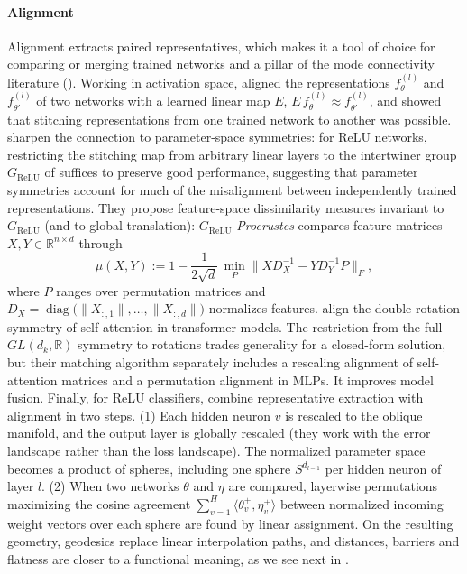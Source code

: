 \documentclass[mathematics,review,submit,moreauthors]{Definitions/mdpi}
\begin{document}
\paragraph{Alignment}
Alignment extracts paired representatives, which makes it a tool of choice for comparing or merging trained networks and a pillar of the mode connectivity literature ().
Working in activation space, \citet{lenc2014a} aligned the representations $f_\theta^{(l)}$ and $f_{\theta'}^{(l)}$ of two networks with a learned linear map $E$, $E\,f_\theta^{(l)}\approx f_{\theta'}^{(l)}$, and showed that stitching representations from one trained network to another was possible.
\citet{godfrey2022} sharpen the connection to parameter-space symmetries: for ReLU networks, restricting the stitching map from arbitrary linear layers to the intertwiner group $G_{\mathrm{ReLU}}$ of  suffices to preserve good performance, suggesting that parameter symmetries account for much of the misalignment between independently trained representations.
They propose feature-space dissimilarity measures invariant to $G_{\mathrm{ReLU}}$ (and to global translation): $G_{\mathrm{ReLU}}$-\emph{Procrustes} compares feature matrices $X,Y\in\mathbb{R}^{n\times d}$ through
\begin{equation*}
    \mu(X,Y):=1-\frac{1}{2\sqrt{d}}\,\min_{P}\big\lVert XD_X^{-1}-YD_Y^{-1}P\big\rVert_F,
\end{equation*}
where $P$ ranges over permutation matrices and $D_X=\operatorname{diag}\big(\lVert X_{:,1}\rVert,\dots,\lVert X_{:,d}\rVert\big)$ normalizes features.
\citet{zhang2025p4icml} align the double rotation symmetry of self-attention in transformer models.
The restriction from the full $GL(d_k,\mathbb{R})$ symmetry to rotations trades generality for a closed-form solution, but their matching algorithm separately includes a rescaling alignment of self-attention matrices and a permutation alignment in MLPs.
It improves model fusion.
Finally, for ReLU classifiers, \citet{pittorino2022jsm} combine representative extraction with alignment in two steps.
(1) Each hidden neuron $v$ is rescaled to the oblique manifold, and the output layer is globally rescaled (they work with the error landscape rather than the loss landscape).
The normalized parameter space becomes a product of spheres, including one sphere $S^{d_{l-1}}$ per hidden neuron of layer $l$.
(2) When two networks $\theta$ and $\eta$ are compared, layerwise permutations maximizing the cosine agreement $\sum_{v=1}^{H}\langle\theta_v^{+},\eta_v^{+}\rangle$ between normalized incoming weight vectors over each sphere are found by linear assignment.
On the resulting geometry, geodesics replace linear interpolation paths, and distances, barriers and flatness are closer to a functional meaning, as we see next in .
\end{document}

